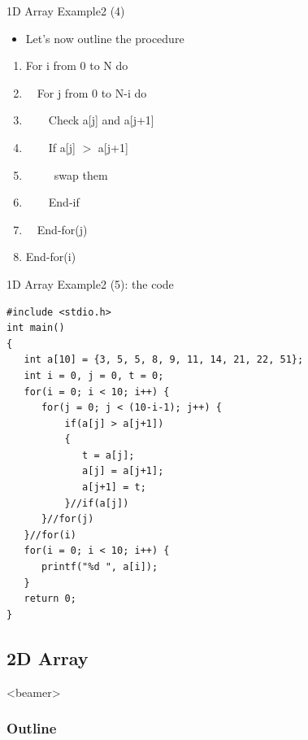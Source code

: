 \begin{frame}{1D Array Example2 (4)}
\begin{itemize}
	\item {Let's now outline the procedure}
\end{itemize}
\begin{enumerate}
	\item {For i from 0 to N do}
	\item {~~For j from 0 to N-i do}
	\item {~~~~Check a[j] and a[j+1]}
	\item {~~~~If a[j] $>$ a[j+1]}
	\item {~~~~~swap them}
	\item {~~~~End-if}
	\item {~~End-for(j)}
	\item {End-for(i)}
\end{enumerate}
\end{frame}

\begin{frame}[fragile]{1D Array Example2 (5): the code}
\vspace{-0.1in}
\begin{lstlisting}[xleftmargin=0.08\linewidth,linewidth=0.9\linewidth]
#include <stdio.h>
int main()
{
   int a[10] = {3, 5, 5, 8, 9, 11, 14, 21, 22, 51};
   int i = 0, j = 0, t = 0;
   for(i = 0; i < 10; i++) {
      for(j = 0; j < (10-i-1); j++) {
          if(a[j] > a[j+1]) 
          {
             t = a[j];
             a[j] = a[j+1];
             a[j+1] = t;
          }//if(a[j])
      }//for(j)
   }//for(i)
   for(i = 0; i < 10; i++) {
      printf("%d ", a[i]);
   }   
   return 0;
}
\end{lstlisting}
\end{frame}

\subsection{2D Array}
\label{sec:2darry}
\begin{frame}<beamer>
    \frametitle{Outline}
\end{frame}

